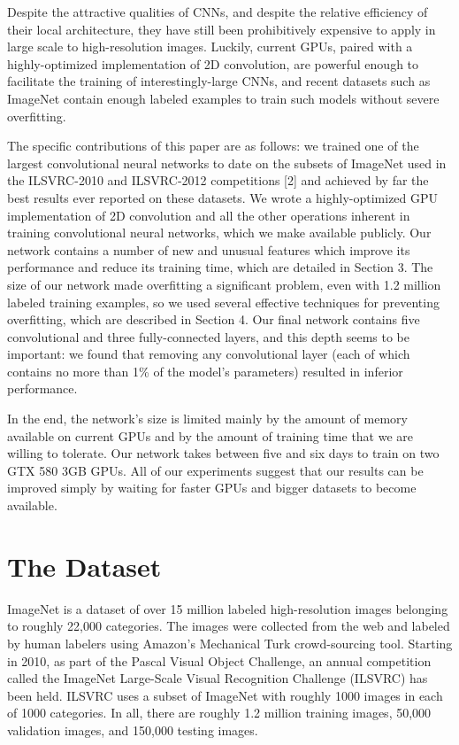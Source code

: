 \documentclass[12pt,a4paper,UTF8,twoside]{book}
\begin{document}
Despite the attractive qualities of CNNs, and despite the relative efficiency of their local architecture, they have still been prohibitively expensive to apply in large scale to high-resolution images. Luckily, current GPUs, paired with a highly-optimized implementation of 2D convolution, are powerful enough to facilitate the training of interestingly-large CNNs, and recent datasets such as ImageNet contain enough labeled examples to train such models without severe overfitting.

The specific contributions of this paper are as follows: we trained one of the largest convolutional neural networks to date on the subsets of ImageNet used in the ILSVRC-2010 and ILSVRC-2012 competitions {[}2{]} and achieved by far the best results ever reported on these datasets. We wrote a highly-optimized GPU implementation of 2D convolution and all the other operations inherent in training convolutional neural networks, which we make available publicly. Our network contains a number of new and unusual features which improve its performance and reduce its training time, which are detailed in Section 3. The size of our network made overfitting a significant problem, even with 1.2 million labeled training examples, so we used several effective techniques for preventing overfitting, which are described in Section 4. Our final network contains five convolutional and three fully-connected layers, and this depth seems to be important: we found that removing any convolutional layer (each of which contains no more than 1\% of the model's parameters) resulted in inferior performance.

In the end, the network's size is limited mainly by the amount of memory available on current GPUs and by the amount of training time that we are willing to tolerate. Our network takes between five and six days to train on two GTX 580 3GB GPUs. All of our experiments suggest that our results can be improved simply by waiting for faster GPUs and bigger datasets to become available.

\hypertarget{the-dataset}{%
\section{The Dataset}\label{the-dataset}}

ImageNet is a dataset of over 15 million labeled high-resolution images belonging to roughly 22,000 categories. The images were collected from the web and labeled by human labelers using Amazon's Mechanical Turk crowd-sourcing tool. Starting in 2010, as part of the Pascal Visual Object Challenge, an annual competition called the ImageNet Large-Scale Visual Recognition Challenge (ILSVRC) has been held. ILSVRC uses a subset of ImageNet with roughly 1000 images in each of 1000 categories. In all, there are roughly 1.2 million training images, 50,000 validation images, and 150,000 testing images.
\end{document}

